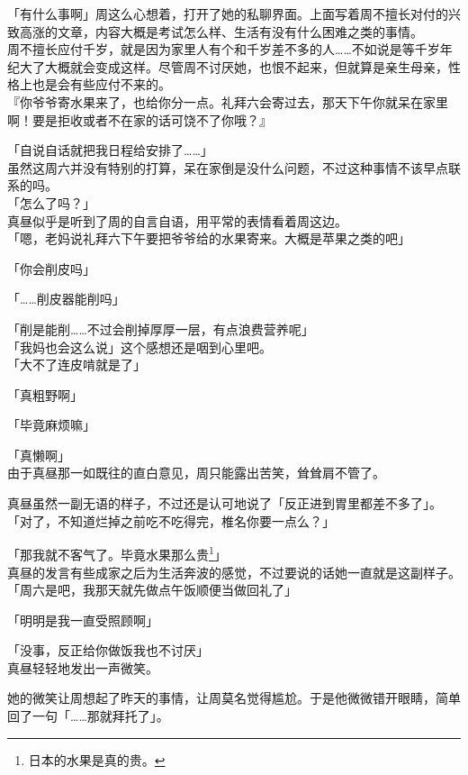 「有什么事啊」周这么心想着，打开了她的私聊界面。上面写着周不擅长对付的兴致高涨的文章，内容大概是考试怎么样、生活有没有什么困难之类的事情。\\

周不擅长应付千岁，就是因为家里人有个和千岁差不多的人……不如说是等千岁年纪大了大概就会变成这样。尽管周不讨厌她，也恨不起来，但就算是亲生母亲，性格上也是会有些应付不来的。\\

『你爷爷寄水果来了，也给你分一点。礼拜六会寄过去，那天下午你就呆在家里啊！要是拒收或者不在家的话可饶不了你哦？』

「自说自话就把我日程给安排了……」\\

虽然这周六并没有特别的打算，呆在家倒是没什么问题，不过这种事情不该早点联系的吗。\\

「怎么了吗？」\\

真昼似乎是听到了周的自言自语，用平常的表情看着周这边。\\

「嗯，老妈说礼拜六下午要把爷爷给的水果寄来。大概是苹果之类的吧」

「你会削皮吗」

「……削皮器能削吗」

「削是能削……不过会削掉厚厚一层，有点浪费营养呢」\\

「我妈也会这么说」这个感想还是咽到心里吧。\\

「大不了连皮啃就是了」

「真粗野啊」

「毕竟麻烦嘛」

「真懒啊」\\

由于真昼那一如既往的直白意见，周只能露出苦笑，耸耸肩不管了。

真昼虽然一副无语的样子，不过还是认可地说了「反正进到胃里都差不多了」。\\

「对了，不知道烂掉之前吃不吃得完，椎名你要一点么？」

「那我就不客气了。毕竟水果那么贵\footnote{日本的水果是真的贵。}」\\

真昼的发言有些成家之后为生活奔波的感觉，不过要说的话她一直就是这副样子。\\

「周六是吧，我那天就先做点午饭顺便当做回礼了」

「明明是我一直受照顾啊」

「没事，反正给你做饭我也不讨厌」\\

真昼轻轻地发出一声微笑。

她的微笑让周想起了昨天的事情，让周莫名觉得尴尬。于是他微微错开眼睛，简单回了一句「……那就拜托了」。
